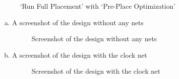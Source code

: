 \documentclass[a4paper,11pt]{article}%
\begin{document}
\begin{enumerate}[1.)]
	\begin{figure}[H]
		\centering
		\caption{`Run Full Placement' with `Pre-Place Optimization'}
		\label{fig:innovus_7_2}
	\end{figure}
	\begin{enumerate}[a.]
		\item A screenshot of the design without any nets
		\begin{figure}[H]
			\centering
			\caption{Screenshot of the design without any nets}
			\label{fig:innovus_9_2}
		\end{figure}
		
		\item A screenshot of the design with the clock net		
		\begin{figure}[H]
			\centering
			\caption{Screenshot of the design with the clock net}
			\label{fig:innovus_9_3}
		\end{figure}
	\end{enumerate}
	

\end{enumerate}
\end{document}
